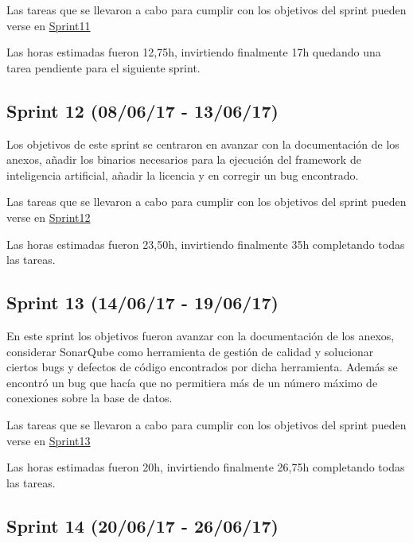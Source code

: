 Las tareas que se llevaron a cabo para cumplir con los objetivos del sprint pueden verse en \href{https://github.com/DanielSantidrian/UBUassistant/milestone/14?closed=1}{Sprint11}

Las horas estimadas fueron 12,75h, invirtiendo finalmente 17h quedando una tarea pendiente para el siguiente sprint.



\subsection{Sprint 12 (08/06/17 - 13/06/17)}

Los objetivos de este sprint se centraron en avanzar con la documentación de los anexos, añadir los binarios necesarios para la ejecución del framework de inteligencia artificial, añadir la licencia y en corregir un bug encontrado.

Las tareas que se llevaron a cabo para cumplir con los objetivos del sprint pueden verse en \href{https://github.com/DanielSantidrian/UBUassistant/milestone/15?closed=1}{Sprint12}

Las horas estimadas fueron 23,50h, invirtiendo finalmente 35h completando todas las tareas.


\subsection{Sprint 13 (14/06/17 - 19/06/17)}

En este sprint los objetivos fueron avanzar con la documentación de los anexos, considerar SonarQube como herramienta de gestión de calidad y solucionar ciertos bugs y defectos de código encontrados por dicha herramienta. Además se encontró un bug que hacía que no permitiera más de un número máximo de conexiones sobre la base de datos.

Las tareas que se llevaron a cabo para cumplir con los objetivos del sprint pueden verse en \href{https://github.com/DanielSantidrian/UBUassistant/milestone/16?closed=1}{Sprint13}

Las horas estimadas fueron 20h, invirtiendo finalmente 26,75h completando todas las tareas.


\subsection{Sprint 14 (20/06/17 - 26/06/17)}


